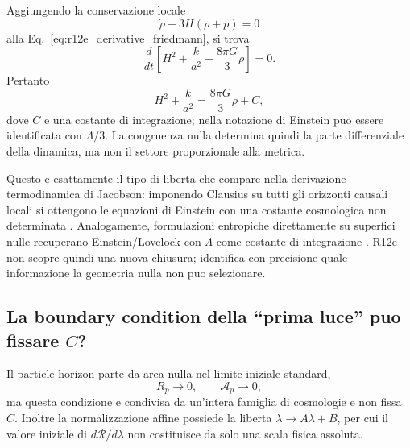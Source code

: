 \documentclass[11pt,a4paper]{article}
\begin{document}
Aggiungendo la conservazione locale
\begin{equation}
 \dot\rho+3H(\rho+p)=0
 \label{eq:r12e_conservation}
\end{equation}
alla Eq.~\eqref{eq:r12e_derivative_friedmann}, si trova
\begin{equation}
 \frac{d}{dt}\left[
 H^2+\frac{k}{a^2}-\frac{8\pi G}{3}\rho
 \right]=0.
\end{equation}
Pertanto
\begin{equation}
 \boxed{\quad
 H^2+\frac{k}{a^2}=\frac{8\pi G}{3}\rho+C,
 \quad}
 \label{eq:r12e_friedmann_constant}
\end{equation}
dove $C$ e una costante di integrazione; nella notazione di Einstein puo essere identificata con $\Lambda/3$. La congruenza nulla determina quindi la parte differenziale della dinamica, ma non il settore proporzionale alla metrica.

Questo e esattamente il tipo di liberta che compare nella derivazione termodinamica di Jacobson: imponendo Clausius su tutti gli orizzonti causali locali si ottengono le equazioni di Einstein con una costante cosmologica non determinata \cite{Jacobson1995}. Analogamente, formulazioni entropiche direttamente su superfici nulle recuperano Einstein/Lovelock con $\Lambda$ come costante di integrazione \cite{PadmanabhanParanjape2007}. R12e non scopre quindi una nuova chiusura; identifica con precisione quale informazione la geometria nulla non puo selezionare.

\subsection{La boundary condition della ``prima luce'' puo fissare $C$?}

Il particle horizon parte da area nulla nel limite iniziale standard,
\begin{equation}
 R_p\to0,\qquad \mathcal A_p\to0,
\end{equation}
ma questa condizione e condivisa da un'intera famiglia di cosmologie e non fissa $C$. Inoltre la normalizzazione affine possiede la liberta $\lambda\to A\lambda+B$, per cui il valore iniziale di $d\mathcal R/d\lambda$ non costituisce da solo una scala fisica assoluta.
\end{document}
